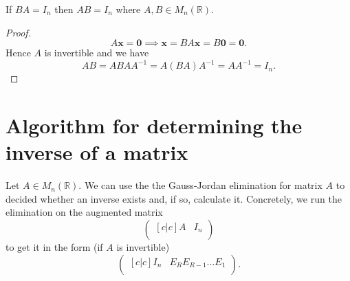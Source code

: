 \begin{proposition}
    If $BA=I_n$ then $AB=I_n$ where $A,B\in M_n(\mathbb R)$.
\end{proposition}

\begin{proof}
    \[A\bm x=\bm 0\implies \bm x=BA\bm x=B\bm 0=\bm 0.\] Hence $A$ is invertible and we have \[AB=ABAA^{-1}=A(BA)A^{-1}=AA^{-1}=I_n.\]
\end{proof}

\section{Algorithm for determining the inverse of a matrix}

Let $A\in M_n(\mathbb R)$. We can use the the Gauss-Jordan elimination for matrix $A$ to decided whether an inverse exists and, if so, calculate it. Concretely, we run the elimination on the augmented matrix 
\[
    \begin{pmatrix}[c|c]
        A&I_n\\
    \end{pmatrix}
\]
to get it in the form (if $A$ is invertible) 
\[
    \begin{pmatrix}[c|c]
        I_n&E_RE_{R-1}\ldots E_1\\
    \end{pmatrix}
    .
\]

